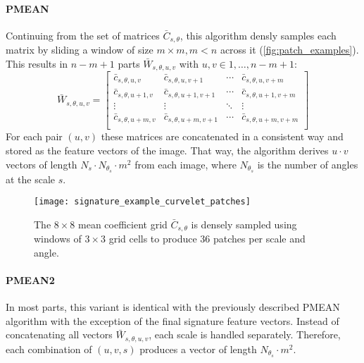 \paragraph{PMEAN}

Continuing from the set of matrices $\bar{C}_{s, \theta}$, this algorithm
densly samples each matrix by sliding a window of size $m \times m, m < n$
across it (\autoref{fig:patch_examples}). This results in $n - m + 1$ parts
$\bar{W}_{s, \theta, u, v}$ with $u, v \in 1, \dots, n - m + 1$:
\begin{equation*}
    \bar{W}_{s,\theta,u,v} =
    \begin{bmatrix}
        \bar{c}_{s,\theta,u,v} & \bar{c}_{s,\theta,u,v+1} & \cdots & \bar{c}_{s,\theta,u,v+m} \\
        \bar{c}_{s,\theta,u+1,v} & \bar{c}_{s,\theta,u+1,v+1} & \cdots & \bar{c}_{s,\theta,u+1,v+m} \\
        \vdots  & \vdots  & \ddots & \vdots  \\
        \bar{c}_{s,\theta,u+m,v} & \bar{c}_{s,\theta,u+m,v+1} & \cdots & \bar{c}_{s,\theta,u+m,v+m} \\
    \end{bmatrix}
\end{equation*}
For each pair $(u, v)$ these matrices are concatenated in a consistent way and
stored as the feature vectors of the image. That way, the algorithm derives $u
\cdot v$ vectors of length $N_s \cdot N_{\theta_s} \cdot m^2$ from each image,
where $N_{\theta_s}$ is the number of angles at the scale $s$.

\begin{figure}[h]
    \centering
    \texttt{[image: signature\_example\_curvelet\_patches]}%
    \caption[Patches on a coefficient grid]{
        The $8 \times 8$ mean coefficient grid $\bar{C}_{s, \theta}$ is densely
        sampled using windows of $3 \times 3$ grid cells to produce $36$
        patches per scale and angle.
    }
    \label{fig:patch_examples}
\end{figure}

\paragraph{PMEAN2}

In most parts, this variant is identical with the previously described PMEAN
algorithm with the exception of the final signature feature vectors. Instead of
concatenating all vectors $\bar{W}_{s, \theta, u, v}$, each scale is handled
separately. Therefore, each combination of $(u, v, s)$ produces a vector of
length $N_{\theta_s} \cdot m^2$.

